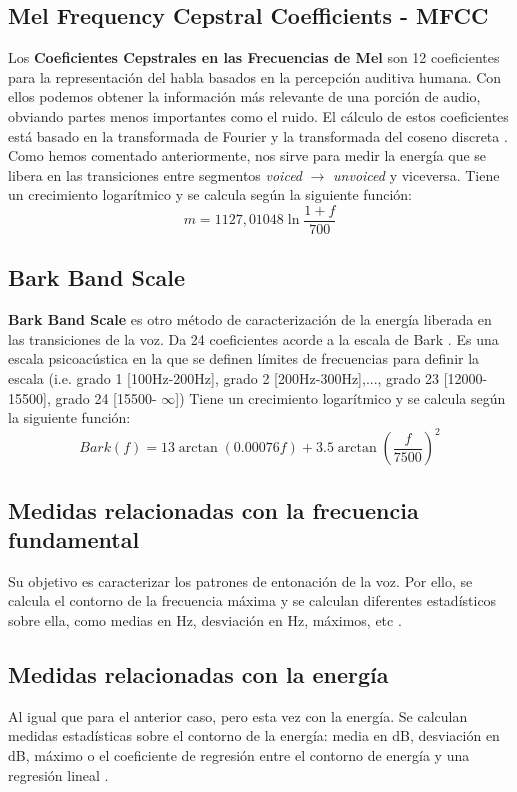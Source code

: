 \subsection{Mel Frequency Cepstral Coefficients - MFCC}\label{subsec:mfcc}
Los \textbf{Coeficientes Cepstrales en las Frecuencias de Mel} son 12 coeficientes para la representación del habla basados en la percepción auditiva humana. Con ellos podemos obtener la información más relevante de una porción de audio, obviando partes menos importantes como el ruido. El cálculo de estos coeficientes está basado en la transformada de Fourier y la transformada del coseno discreta \cite{wiki:mfcc}. Como hemos comentado anteriormente, nos sirve para medir la energía que se libera en las transiciones entre segmentos \textit{voiced} $\rightarrow$ \textit{unvoiced} y viceversa. Tiene un crecimiento logarítmico y se calcula según la siguiente función:
\begin{equation}
m = 1127,01048\ln{\frac{1+f}{700}}
\end{equation}

\subsection{Bark Band Scale}
\textbf{Bark Band Scale} es otro método de caracterización de la energía liberada en las transiciones de la voz. Da 24 coeficientes acorde a la escala de Bark \cite{bbe}. Es una escala psicoacústica en la que se definen límites de frecuencias para definir la escala (i.e. grado 1 [100Hz-200Hz], grado 2 [200Hz-300Hz],..., grado 23 [12000-15500], grado 24 [15500- $\infty$])
Tiene un crecimiento logarítmico y se calcula según la siguiente función:
\begin{equation}
\mathit{Bark}(f) = 13 \arctan(0.00076 f)+ 3.5 \arctan \left ( \frac{f}{7500} \right )^{2}
\end{equation}


\subsection{Medidas relacionadas con la frecuencia fundamental}
Su objetivo es caracterizar los patrones de entonación de la voz. Por ello, se calcula el contorno de la frecuencia máxima y se calculan diferentes estadísticos sobre ella, como medias en Hz, desviación en Hz, máximos, etc \cite{neurospeech}.

\subsection{Medidas relacionadas con la energía}
Al igual que para el anterior caso, pero esta vez con la energía. Se calculan medidas estadísticas sobre el contorno de la energía: media en dB, desviación en dB, máximo o el coeficiente de regresión entre el contorno de energía y una regresión lineal \cite{neurospeech}.
